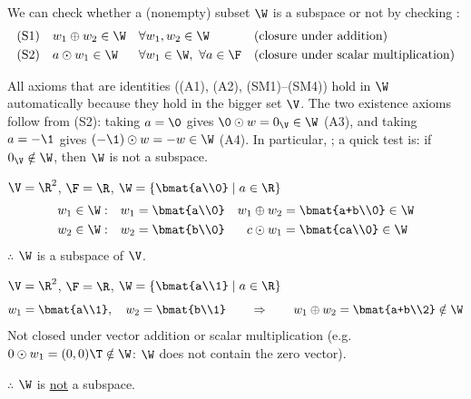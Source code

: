 \begin{remark}
We can check whether a (nonempty) subset $\W$ is a subspace or not by checking :
\begin{align*}
&\text{(S1)} \quad w_1\oplus w_2\in\W && \forall w_1,w_2\in\W && \text{(closure under addition)}\\
&\text{(S2)} \quad a\odot w_1\in\W && \forall w_1\in\W,\ \forall a\in\F && \text{(closure under scalar multiplication)}
\end{align*}
\end{remark}
\begin{insight}
All axioms that are identities ((A1), (A2), (SM1)--(SM4)) hold in $\W$ automatically because they hold in the bigger set $\V$. The two existence axioms follow from (S2): taking $a=\0$ gives $\0\odot w=0_{\V}\in\W$ (A3), and taking $a=-\1$ gives $(-\1)\odot w=-w\in\W$ (A4). In particular, ; a quick test is: if $0_{\V}\notin\W$, then $\W$ is not a subspace.
\end{insight}

\begin{example}
$\V=\R^2$, $\F=\R$, \quad $\W = \left\{ \bmat{a\\0} \;\middle|\; a\in\R \right\}$
\begin{align*}
w_1\in\W:&\quad w_1 = \bmat{a\\0} & w_1\oplus w_2 &= \bmat{a+b\\0}\in\W\\
w_2\in\W:&\quad w_2 = \bmat{b\\0} & c\odot w_1 &= \bmat{ca\\0}\in\W
\end{align*}
$\therefore$ $\W$ is a subspace of $\V$.
\end{example}

\begin{example}
$\V=\R^2$, $\F=\R$, \quad $\W = \left\{ \bmat{a\\1} \;\middle|\; a\in\R \right\}$
\[
w_1 = \bmat{a\\1}, \quad w_2=\bmat{b\\1} \qquad\Rightarrow\qquad w_1\oplus w_2 = \bmat{a+b\\2}\notin\W
\]
Not closed under vector addition or scalar multiplication (e.g.\ $0\odot w_1 = (0,0)\T\notin\W$: $\W$ does not contain the zero vector).

$\therefore$ $\W$ is \underline{not} a subspace.
\end{example}

